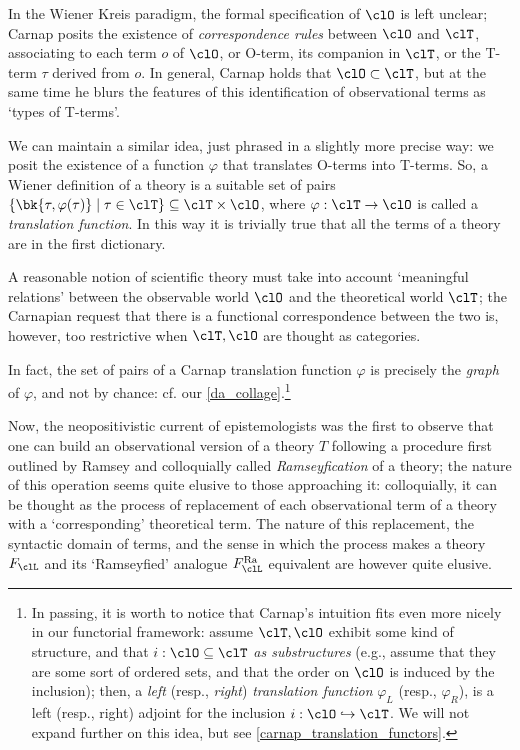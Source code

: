 In the Wiener Kreis paradigm, the formal specification of $\clO$ is left unclear; Carnap \cite{carnapfound} posits the existence of \emph{correspondence rules} between $\clO$ and $\clT$, associating to each term $o$ of $\clO$, or O-term, its companion in $\clT$, or the T-term $\tau$ derived from $o$. In general, Carnap holds that $\clO \subset \clT$, but at the same time he blurs the features of this identification of observational terms as `types of T-terms'.

We can maintain a similar idea, just phrased in a slightly more precise way: we posit the existence of a function $\varphi$ that translates O-terms into T-terms. So, a Wiener definition of a theory is a suitable set of pairs $\{\bk{\tau,\varphi(\tau)} \mid \tau\in\clT\}\subseteq \clT\times\clO$, where $\varphi: \clT \to \clO$ is called a \emph{translation function}. In this way it is trivially true that all the terms of a theory are in the first dictionary.
\begin{remark*}
	A reasonable notion of scientific theory must take into account `meaningful relations' between the observable world $\clO$ and the theoretical world $\clT$; the Carnapian request that there is a functional correspondence between the two is, however, too restrictive when $\clT,\clO$ are thought as categories.
\end{remark*}
In fact, the set of pairs of a Carnap translation function $\varphi$ is precisely the \emph{graph} of $\varphi$, and not by chance: cf. our \autoref{da_collage}.\footnote{In passing, it is worth to notice that Carnap's intuition fits even more nicely in our functorial framework: assume $\clT, \clO$ exhibit some kind of structure, and that $i : \clO\subseteq\clT$ \emph{as substructures} (e.g., assume that they are some sort of ordered sets, and that the order on $\clO$ is induced by the inclusion); then, a \emph{left} (resp., \emph{right}) \emph{translation function} $\varphi_L$ (resp., $\varphi_R$), is a left (resp., right) adjoint for the inclusion $i : \clO\hookrightarrow \clT$. We will not expand further on this idea, but see \autoref{carnap_translation_functors}.}

Now, the neopositivistic current of epistemologists was the first to observe that one can build an observational version of a theory $T$ following a procedure first outlined by Ramsey \cite{?} and colloquially called \emph{Ramseyfication} of a theory; the nature of this operation seems quite elusive to those approaching it: colloquially, it can be thought as the process of replacement of each observational term of a theory with a `corresponding' theoretical term. The nature of this replacement, the syntactic domain of terms, and the sense in which the process makes a theory $F_\clL$ and its `Ramseyfied' analogue $F_\clL^\text{Ra}$ equivalent are however quite elusive.

